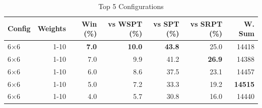 \begin{table}[htbp]%
\centering%
\begin{tabular}{lrrrrrr}%
\toprule%
\textbf{Config}&\textbf{Weights}&\textbf{Win (\%)}&\textbf{vs WSPT (\%)}&\textbf{vs SPT (\%)}&\textbf{vs SRPT (\%)}&\textbf{W. Sum}\\%
\midrule%
6×6&1-10&\textbf{7.0}&\textbf{10.0}&\textbf{43.8}&25.0&14418\\%
6×6&1-10&7.0&9.9&41.2&\textbf{26.9}&14388\\%
6×6&1-10&6.0&8.6&37.5&23.1&14457\\%
6×6&1-10&5.0&7.2&33.3&19.2&\textbf{14515}\\%
6×6&1-10&4.0&5.7&30.8&16.0&14440\\%
\bottomrule%
\end{tabular}%
\caption{Top 5 Configurations}%
\label{tab:summary}%
\end{table}